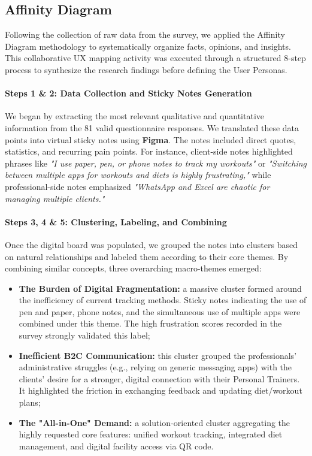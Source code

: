\subsection{Affinity Diagram}\label{subsect:AffinityDiagram}
Following the collection of raw data from the survey, we applied the Affinity Diagram methodology to systematically organize facts, opinions, and insights. This collaborative UX mapping activity was executed through a structured 8-step process to synthesize the research findings before defining the User Personas.

\paragraph{Steps 1 \& 2: Data Collection and Sticky Notes Generation}
We began by extracting the most relevant qualitative and quantitative information from the 81 valid questionnaire responses. We translated these data points into virtual sticky notes using \textbf{Figma}. The notes included direct quotes, statistics, and recurring pain points. For instance, client-side notes highlighted phrases like \textit{"I use paper, pen, or phone notes to track my workouts"} or \textit{"Switching between multiple apps for workouts and diets is highly frustrating,"} while professional-side notes emphasized \textit{"WhatsApp and Excel are chaotic for managing multiple clients."}

\paragraph{Steps 3, 4 \& 5: Clustering, Labeling, and Combining}
Once the digital board was populated, we grouped the notes into clusters based on natural relationships and labeled them according to their core themes. By combining similar concepts, three overarching macro-themes emerged:
\begin{itemize}
    \item \textbf{The Burden of Digital Fragmentation:} a massive cluster formed around the inefficiency of current tracking methods. Sticky notes indicating the use of pen and paper, phone notes, and the simultaneous use of multiple apps were combined under this theme. The high frustration scores recorded in the survey strongly validated this label;
    \item \textbf{Inefficient B2C Communication:} this cluster grouped the professionals' administrative struggles (e.g., relying on generic messaging apps) with the clients' desire for a stronger, digital connection with their Personal Trainers. It highlighted the friction in exchanging feedback and updating diet/workout plans;
    \item \textbf{The "All-in-One" Demand:} a solution-oriented cluster aggregating the highly requested core features: unified workout tracking, integrated diet management, and digital facility access via QR code. 
\end{itemize}

